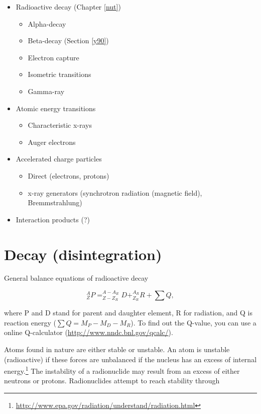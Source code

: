 \documentclass[]{book}
\providecommand{\tightlist}{%
  \setlength{\itemsep}{0pt}\setlength{\parskip}{0pt}}
\let\rmarkdownfootnote\footnote%
\def\footnote{\protect\rmarkdownfootnote}
\theoremstyle{definition}
\theoremstyle{definition}
\theoremstyle{definition}
\theoremstyle{remark}
\begin{document}
\begin{itemize}
\tightlist
\item
  Radioactive decay (Chapter \ref{nut})

  \begin{itemize}
  \tightlist
  \item
    Alpha-decay
  \item
    Beta-decay (Section \ref{y90})
  \item
    Electron capture
  \item
    Isometric transitions
  \item
    Gamma-ray
  \end{itemize}
\item
  Atomic energy transitions

  \begin{itemize}
  \tightlist
  \item
    Characteristic x-rays
  \item
    Auger electrons
  \end{itemize}
\item
  Accelerated charge particles

  \begin{itemize}
  \tightlist
  \item
    Direct (electrons, protons)
  \item
    x-ray generators (synchrotron radiation (magnetic field),
    Bremmstrahlung)
  \end{itemize}
\item
  Interaction products (?)
\end{itemize}

\section{Decay (disintegration)}\label{decays}

General balance equations of radioactive decay

\begin{equation}
 _Z^A P = ^{A-A_R}_{Z-Z_R}D + _{Z_R}^{A_R}R + \sum Q, 
\end{equation}

where P and D stand for parent and daughter element, R for radiation,
and Q is reaction energy (\(\sum Q = M_P-M_D-M_R\)). To find out the
Q-value, you can use a online Q-calculator
(\url{http://www.nndc.bnl.gov/qcalc/}).

Atoms found in nature are either stable or unstable. An atom is unstable
(radioactive) if these forces are unbalanced if the nucleus has an
excess of internal energy.\footnote{\url{http://www.epa.gov/radiation/understand/radiation.html}}
The instability of a radionuclide may result from an excess of either
neutrons or protons. Radionuclides attempt to reach stability through
\end{document}
